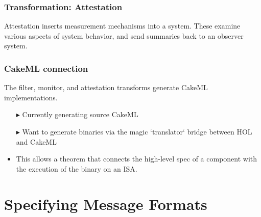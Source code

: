 \documentclass{beamer}
\begin{document}
\begin{frame}\frametitle{Transformation: Attestation}

Attestation inserts measurement mechanisms into a system. These
examine various aspects of system behavior, and send summaries back to
an observer system.


\begin{center}
\end{center}



\end{frame}

\begin{frame}\frametitle{CakeML connection}

  The filter, monitor, and attestation transforms generate CakeML implementations.

\begin{itemize}
 \item [$\blacktriangleright$] Currently generating source CakeML

 \item [$\blacktriangleright$] Want to generate binaries via the magic
   `translator` bridge between HOL and CakeML

\item This allows a theorem that connects the high-level spec of a
  component with the execution of the binary on an ISA.
\end{itemize}

\end{frame}


\section {Specifying Message Formats}
\end{document}
